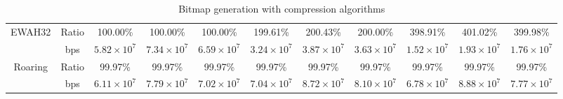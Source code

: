 \begin{table}[h]
{\begin{tabular}{|c|c|c|c|c|c|c|c|c|c|c|}
\hline
\multirow{2}{*}{EWAH32} & Ratio & 100.00\% & 100.00\% & 100.00\% & 199.61\% & 200.43\% & 200.00\% & 398.91\% & 401.02\% & 399.98\% \\
\cline{2-11}
& bps & $5.82 \times 10^7$ & $7.34 \times 10^7$ & $6.59 \times 10^7$ & $3.24 \times 10^7$ & $3.87 \times 10^7$ & $3.63 \times 10^7$ & $1.52 \times 10^7$ & $1.93 \times 10^7$ & $1.76 \times 10^7$ \\
\hline
\multirow{2}{*}{Roaring} & Ratio & 99.97\% & 99.97\% & 99.97\% & 99.97\% & 99.97\% & 99.97\% & 99.97\% & 99.97\% & 99.97\% \\
\cline{2-11}
& bps & $6.11 \times 10^7$ & $7.79 \times 10^7$ & $7.02 \times 10^7$ & $7.04 \times 10^7$ & $8.72 \times 10^7$ & $8.10 \times 10^7$ & $6.78 \times 10^7$ & $8.88 \times 10^7$ & $7.77 \times 10^7$ \\
\hline
\end{tabular}
}
\caption{Bitmap generation with compression algorithms}
\label{tbl:statecompress}
\end{table}


